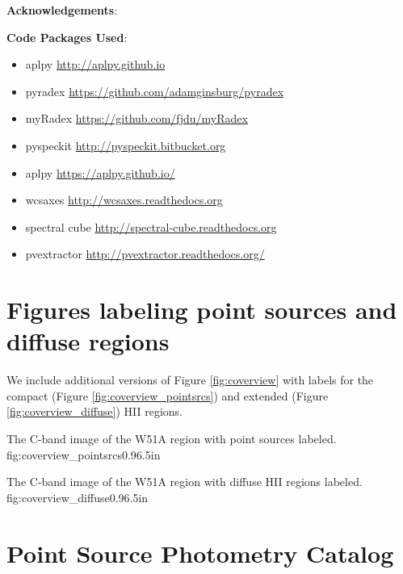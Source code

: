 \textbf{Acknowledgements}:

\textbf{Code Packages Used}:

\begin{itemize}
    \item aplpy \url{http://aplpy.github.io}
    \item pyradex \url{https://github.com/adamginsburg/pyradex}
    \item myRadex \url{https://github.com/fjdu/myRadex}
    \item pyspeckit \url{http://pyspeckit.bitbucket.org}
    \item aplpy \url{https://aplpy.github.io/}
    \item wcsaxes \url{http://wcsaxes.readthedocs.org}
    \item spectral cube \url{http://spectral-cube.readthedocs.org}
    \item pvextractor \url{http://pvextractor.readthedocs.org/}
\end{itemize}



\appendix
\section{Figures labeling point sources and diffuse regions}
We include additional versions of Figure \ref{fig:coverview} with labels for
the compact (Figure \ref{fig:coverview_pointsrcs}) and extended (Figure
\ref{fig:coverview_diffuse}) HII regions.

{The C-band image of the W51A region with point sources labeled.}
{fig:coverview_pointsrcs}{0.9}{6.5in}

{The C-band image of the W51A region with diffuse HII regions labeled.}
{fig:coverview_diffuse}{0.9}{6.5in}

%

\section{Point Source Photometry Catalog}





